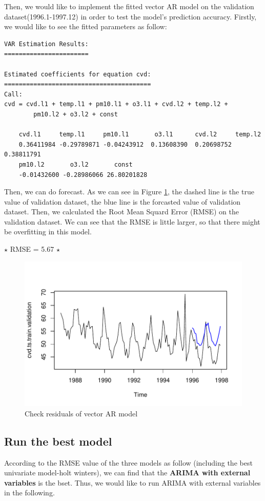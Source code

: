 \documentclass{article}
\begin{document}
\vspace{4pt}
Then, we would like to implement the fitted vector AR model on the validation dataset(1996.1-1997.12) in order to test the model's prediction accuracy. 
Firstly, we would like to see the fitted parameters as follow:
\begin{lstlisting}
VAR Estimation Results:
======================= 

Estimated coefficients for equation cvd: 
======================================== 
Call:
cvd = cvd.l1 + temp.l1 + pm10.l1 + o3.l1 + cvd.l2 + temp.l2 + 
        pm10.l2 + o3.l2 + const 

    cvd.l1     temp.l1     pm10.l1       o3.l1      cvd.l2     temp.l2  
    0.36411984 -0.29789871 -0.04243912  0.13608390  0.20698752  0.38811791 
    pm10.l2       o3.l2       const
    -0.01432600 -0.28986066 26.80201828 
\end{lstlisting}
Then, we can do forecast. As we can see in Figure \ref{var-forecast}, the dashed line is the true 
value of validation dataset, the blue line is the forcasted value of validation dataset. Then, we calculated the Root Mean Squard Error (RMSE) on the validation dataset. 
We can see that the RMSE is little larger, so that there might be overfitting in this model.

$\star$ RMSE = 5.67 $\star$
\begin{figure}[H]
    \centering
    \includegraphics[width=0.58\linewidth]{images/var-forecast}
    \caption{Check residuals of vector AR model}
    \label{var-forecast}
\end{figure}

\vspace{4pt}
\subsection{Run the best model}

According to the RMSE value of the three models as follow (including the best univariate model-holt winters), we can find that the \textbf{ARIMA with external variables} is the bset. Thus, we would like to run ARIMA with external variables in the following.
\end{document}

